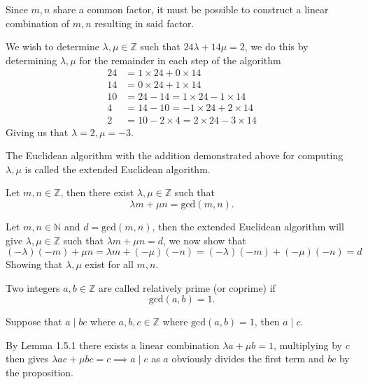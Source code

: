 Since $m,n$ share a common factor, it must be possible to construct a linear combination of $m,n$ resulting in said factor.
\begin{exmp}
    We wish to determine $\lambda,\mu\in\mathbb{Z}$ such that $24\lambda+14\mu=2$, we do this by determining $\lambda,\mu$ for the remainder in each step of the algorithm
    \begin{align*}
        24&=1\times 24+0\times 14 \\
        14&=0\times 24+1\times 14 \\
        10&=24-14=1\times 24-1\times 14 \\
        4&=14-10=-1\times 24+2\times 14 \\
        2&=10-2\times 4=2\times 24-3\times 14
    \end{align*}
    Giving us that $\lambda=2,\mu=-3$.
\end{exmp}
\begin{defi}
    The Euclidean algorithm with the addition demonstrated above for computing $\lambda,\mu$ is called the extended Euclidean algorithm.
\end{defi}
\begin{lemm}
    Let $m,n\in\mathbb{Z}$, then there exist $\lambda,\mu\in\mathbb{Z}$ such that
    \[
        \lambda m+\mu n=\text{gcd}(m,n)
    .\]\vskip -10pt
\end{lemm}
\begin{prf}
    Let $m,n\in\mathbb{N}$ and $d=\text{gcd}(m,n)$, then the extended Euclidean algorithm will give $\lambda,\mu\in\mathbb{Z}$ such that $\lambda m+\mu n=d$, we now show that
    \[
        (-\lambda)(-m)+\mu n=\lambda m+(-\mu)(-n)=(-\lambda)(-m)+(-\mu)(-n)=d
    \]
    Showing that $\lambda,\mu$ exist for all $m,n$.
\end{prf}\vskip -10pt
\begin{defi}
    Two integers $a,b\in\mathbb{Z}$ are called relatively prime (or coprime) if
    \[
        \text{gcd}(a,b)=1
    .\]\vskip -10pt
\end{defi}
\begin{coro}
    Suppose that $a\mid bc$ where $a,b,c\in\mathbb{Z}$ where $\text{gcd}(a,b)=1$, then $a\mid c$.
\end{coro}
\begin{prf}
    By Lemma 1.5.1 there exists a linear combination $\lambda a+\mu b=1$, multiplying by $c$ then gives $\lambda ac+\mu bc=c\implies a\mid c$ as $a$ obviously divides the first term and $bc$ by the proposition.
\end{prf}\vskip -10pt
